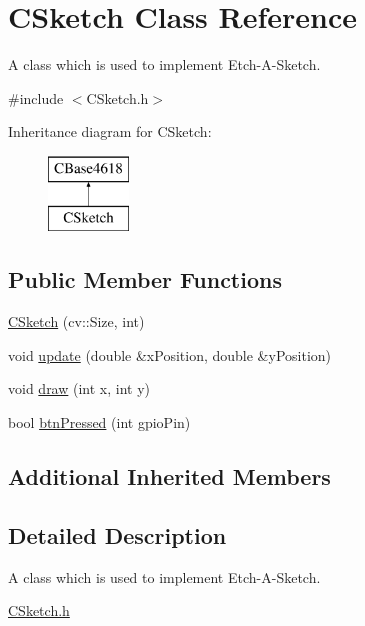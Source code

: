 \hypertarget{class_c_sketch}{}\section{C\+Sketch Class Reference}
\label{class_c_sketch}


A class which is used to implement Etch-\/\+A-\/\+Sketch.  




{\ttfamily \#include $<$C\+Sketch.\+h$>$}

Inheritance diagram for C\+Sketch\+:\begin{figure}[H]
\begin{center}
\leavevmode
\includegraphics[height=2.000000cm]{class_c_sketch}
\end{center}
\end{figure}
\subsection*{Public Member Functions}
\begin{DoxyCompactItemize}
\item 
\hyperlink{class_c_sketch_aa426bb25ef429d04103b180863dbc11a}{C\+Sketch} (cv\+::\+Size, int)
\item 
void \hyperlink{class_c_sketch_a81582a1c6eb7524db76546565412a88b}{update} (double \&x\+Position, double \&y\+Position)
\item 
void \hyperlink{class_c_sketch_a9b5af655812ecfa15791f5199854a3a4}{draw} (int x, int y)
\item 
bool \hyperlink{class_c_sketch_a9e73bdd4ab788236c1a682459d6a6075}{btn\+Pressed} (int gpio\+Pin)
\end{DoxyCompactItemize}
\subsection*{Additional Inherited Members}


\subsection{Detailed Description}
A class which is used to implement Etch-\/\+A-\/\+Sketch. 

\hyperlink{_c_sketch_8h_source}{C\+Sketch.\+h}

